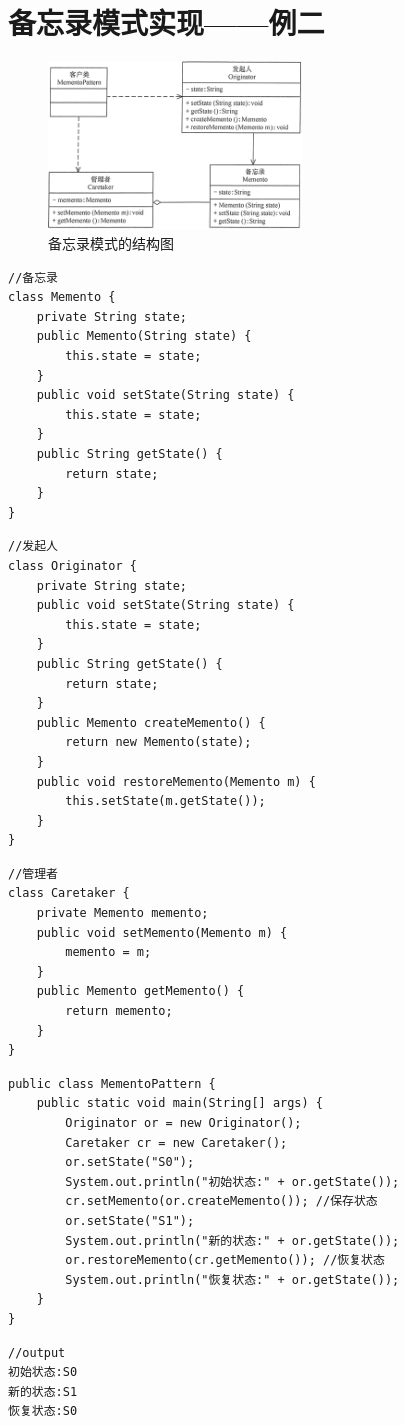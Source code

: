 \section{备忘录模式实现——例二}
\begin{figure}[!h]
	\centering
	\includegraphics[width=0.6\textwidth]{image/18-3}
	\caption{备忘录模式的结构图}
\end{figure}
\begin{lstlisting}
//备忘录
class Memento {
	private String state;
	public Memento(String state) {
		this.state = state;
	}
	public void setState(String state) {
		this.state = state;
	}
	public String getState() {
		return state;
	}
}
\end{lstlisting}
\begin{lstlisting}
//发起人
class Originator {
	private String state;
	public void setState(String state) {
		this.state = state;
	}
	public String getState() {
		return state;
	}
	public Memento createMemento() {
		return new Memento(state);
	}
	public void restoreMemento(Memento m) {
		this.setState(m.getState());
	}
}
\end{lstlisting}
\begin{lstlisting}
//管理者
class Caretaker {
	private Memento memento;
	public void setMemento(Memento m) {
		memento = m;
	}
	public Memento getMemento() {
		return memento;
	}
}
\end{lstlisting}
\begin{lstlisting}
public class MementoPattern {
	public static void main(String[] args) {
		Originator or = new Originator();
		Caretaker cr = new Caretaker();
		or.setState("S0");
		System.out.println("初始状态:" + or.getState());
		cr.setMemento(or.createMemento()); //保存状态
		or.setState("S1");
		System.out.println("新的状态:" + or.getState());
		or.restoreMemento(cr.getMemento()); //恢复状态
		System.out.println("恢复状态:" + or.getState());
	}
}
\end{lstlisting}
\begin{lstlisting}
//output
初始状态:S0
新的状态:S1
恢复状态:S0
\end{lstlisting}

